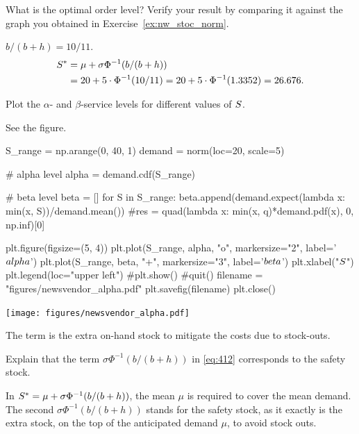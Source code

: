 \begin{exercise}[Continuation with $\sigma=5$]
What is the optimal order level? Verify your result by comparing it against the graph you obtained in Exercise~\ref{ex:nw_stoc_norm}. 



\begin{solution}
$b/(b+h)=10/11$. 
\begin{align*}
S^* 
& = \mu + \sigma \Phi^{-1}(b/(b+h)) \\
& = 20 + 5\cdot \Phi^{-1}(10/11) = 20 + 5\cdot \Phi^{-1}(1.3352) = 26.676.
\end{align*}
\end{solution}
\end{exercise}


\begin{exercise}[Continuation]
Plot the $\alpha$- and $\beta$-service levels for different values of $S$.
\begin{solution}
See the figure.

\begin{pycode}[news]
S_range = np.arange(0, 40, 1)
demand = norm(loc=20, scale=5)

# alpha level
alpha = demand.cdf(S_range)

# beta level 
beta = []
for S in S_range:
    beta.append(demand.expect(lambda x: min(x, S))/demand.mean())
    #res = quad(lambda x: min(x, q)*demand.pdf(x), 0, np.inf)[0]


plt.figure(figsize=(5, 4))
plt.plot(S_range, alpha, "o", markersize="2", label='$\\alpha$')
plt.plot(S_range, beta, "+", markersize="3", label='$\\beta$')
plt.xlabel("$S$")
plt.legend(loc="upper left")
#plt.show()
#quit()
filename = "figures/newsvendor_alpha.pdf"
plt.savefig(filename)
plt.close()
\end{pycode}

\begin{center}
\texttt{[image: figures/newsvendor\_alpha.pdf]}
\end{center}
\end{solution}
\end{exercise}


The term  is the extra on-hand stock to mitigate the costs due to stock-outs. 

\begin{exercise}
Explain that the term $\sigma \Phi^{-1}(b/(b+h))$ in \eqref{eq:412} corresponds to the  safety stock.
\begin{solution}
In $S^* = \mu + \sigma \Phi^{-1}(b/(b+h))$, the mean $\mu$ is required to cover the mean demand. The second $\sigma \Phi^{-1}(b/(b+h))$ stands for the safety stock, as it exactly is the extra stock, on the top of the anticipated demand $\mu$, to avoid stock outs.
\end{solution}
\end{exercise}

